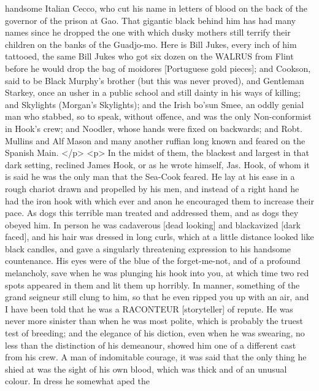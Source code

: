       handsome Italian Cecco, who cut his name in letters of blood on the back
      of the governor of the prison at Gao. That gigantic black behind him has
      had many names since he dropped the one with which dusky mothers still
      terrify their children on the banks of the Guadjo-mo. Here is Bill Jukes,
      every inch of him tattooed, the same Bill Jukes who got six dozen on the
      WALRUS from Flint before he would drop the bag of moidores [Portuguese
      gold pieces]; and Cookson, said to be Black Murphy's brother (but this was
      never proved), and Gentleman Starkey, once an usher in a public school and
      still dainty in his ways of killing; and Skylights (Morgan's Skylights);
      and the Irish bo'sun Smee, an oddly genial man who stabbed, so to speak,
      without offence, and was the only Non-conformist in Hook's crew; and
      Noodler, whose hands were fixed on backwards; and Robt. Mullins and Alf
      Mason and many another ruffian long known and feared on the Spanish Main.
    </p>
    <p>
      In the midst of them, the blackest and largest in that dark setting,
      reclined James Hook, or as he wrote himself, Jas. Hook, of whom it is said
      he was the only man that the Sea-Cook feared. He lay at his ease in a
      rough chariot drawn and propelled by his men, and instead of a right hand
      he had the iron hook with which ever and anon he encouraged them to
      increase their pace. As dogs this terrible man treated and addressed them,
      and as dogs they obeyed him. In person he was cadaverous [dead looking]
      and blackavized [dark faced], and his hair was dressed in long curls,
      which at a little distance looked like black candles, and gave a
      singularly threatening expression to his handsome countenance. His eyes
      were of the blue of the forget-me-not, and of a profound melancholy, save
      when he was plunging his hook into you, at which time two red spots
      appeared in them and lit them up horribly. In manner, something of the
      grand seigneur still clung to him, so that he even ripped you up with an
      air, and I have been told that he was a RACONTEUR [storyteller] of repute.
      He was never more sinister than when he was most polite, which is probably
      the truest test of breeding; and the elegance of his diction, even when he
      was swearing, no less than the distinction of his demeanour, showed him
      one of a different cast from his crew. A man of indomitable courage, it
      was said that the only thing he shied at was the sight of his own blood,
      which was thick and of an unusual colour. In dress he somewhat aped the

